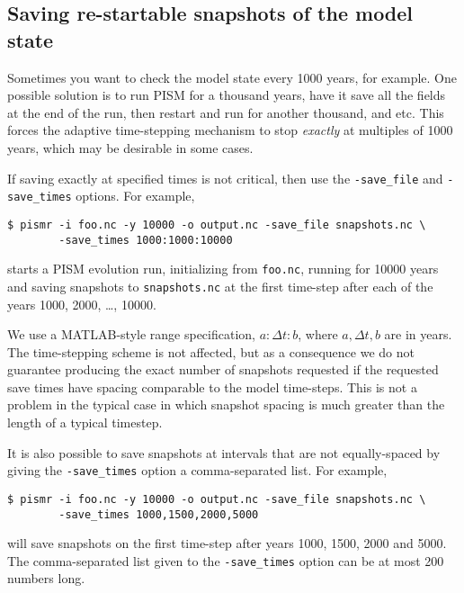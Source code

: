 \subsection{Saving re-startable snapshots of the model state}
\label{sec:snapshots}
Sometimes you want to check the model state every 1000 years, for example.  One possible solution is to run PISM for a thousand years, have it save all the fields at the end of the run, then restart and run for another thousand, and etc.  This forces the adaptive time-stepping mechanism to stop \emph{exactly} at multiples of 1000 years, which may be desirable in some cases.

If saving exactly at specified times is not critical, then use the \texttt{-save_file} and \texttt{-save_times} options.  For example,
\begin{verbatim}
$ pismr -i foo.nc -y 10000 -o output.nc -save_file snapshots.nc \
        -save_times 1000:1000:10000
\end{verbatim}
starts a PISM evolution run, initializing from \texttt{foo.nc}, running for
10000 years and saving snapshots to \texttt{snapshots.nc} at the first time-step
after each of the years 1000, 2000, \dots, 10000.

We use a MATLAB-style range specification, $a:\Delta t:b$, where $a,\Delta t,b$ are in years.  The time-stepping scheme is not affected, but as a consequence we do not guarantee producing the exact number of snapshots requested if the requested save times have spacing comparable to the model time-steps.  This is not a problem in the typical case in which snapshot spacing is much greater than the length of a typical timestep.

It is also possible to save snapshots at intervals that are not equally-spaced
by giving the \texttt{-save_times} option a comma-separated list. For example,
\begin{verbatim}
$ pismr -i foo.nc -y 10000 -o output.nc -save_file snapshots.nc \
        -save_times 1000,1500,2000,5000
\end{verbatim}
will save snapshots on the first time-step after years 1000, 1500, 2000 and 5000.
The comma-separated list given to the \texttt{-save_times} option can be at most 200 numbers long.

